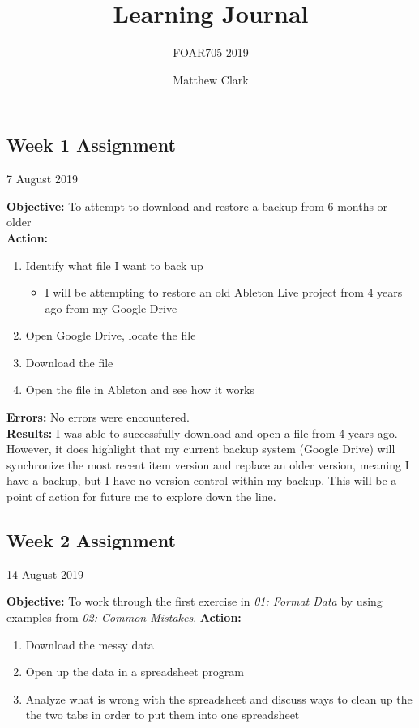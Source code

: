\documentclass{article}
\title{Learning Journal}
\subtitle{FOAR705 2019}
\author{Matthew Clark}
\date{\vspace{-5ex}} %
\begin{document}
\maketitle
\newpage
\begin{center}
\section*{Week 1 Assignment}
7 August 2019
\end{center}
\noindent
\textbf{Objective:} To attempt to download and restore a backup from 6 months or older\\
\textbf{Action:}
\begin{enumerate}
    \item Identify what file I want to back up
    \begin{itemize}
        \item I will be attempting to restore an old Ableton Live project from 4 years ago from my Google Drive
    \end{itemize}
    \item Open Google Drive, locate the file
    \item Download the file
    \item Open the file in Ableton and see how it works
\end{enumerate}
\textbf{Errors:} No errors were encountered. \\
\textbf{Results:} I was able to successfully download and open a file from 4 years ago. However, it does highlight that my current backup system (Google Drive) will synchronize the most recent item version and replace an older version, meaning I have a backup, but I have no version control within my backup. This will be a point of action for future me to explore down the line.
\newpage
\begin{center}
\section*{Week 2 Assignment}
14 August 2019
\end{center}
\noindent
\textbf{Objective:} To work through the first exercise in \textit{01: Format Data} by using examples from \textit{02: Common Mistakes}.
\newline
\textbf{Action:}
\begin{enumerate}
    \item Download the messy data
    \item Open up the data in a spreadsheet program
    \item Analyze what is wrong with the spreadsheet and discuss ways to clean up the the two tabs in order to put them into one spreadsheet
\end{enumerate}
\end{document}
